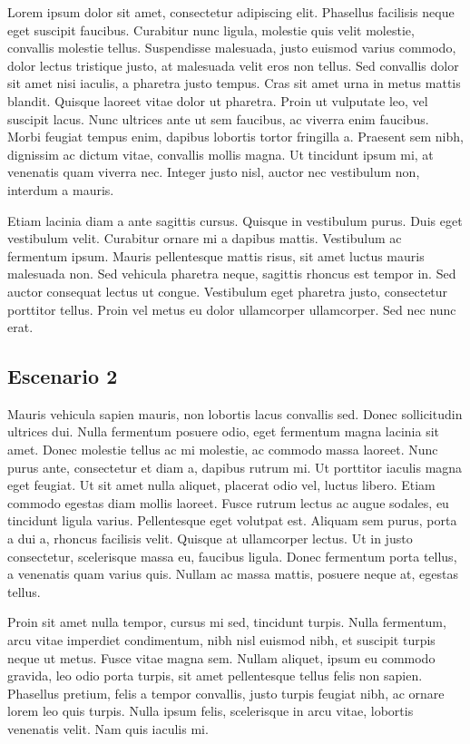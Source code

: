 \documentclass[a4paper, 10pt, twoside]{article}
\begin{document}
Lorem ipsum dolor sit amet, consectetur adipiscing elit. Phasellus facilisis neque eget suscipit faucibus. Curabitur nunc ligula, molestie quis velit molestie, convallis molestie tellus. Suspendisse malesuada, justo euismod varius commodo, dolor lectus tristique justo, at malesuada velit eros non tellus. Sed convallis dolor sit amet nisi iaculis, a pharetra justo tempus. Cras sit amet urna in metus mattis blandit. Quisque laoreet vitae dolor ut pharetra. Proin ut vulputate leo, vel suscipit lacus. Nunc ultrices ante ut sem faucibus, ac viverra enim faucibus. Morbi feugiat tempus enim, dapibus lobortis tortor fringilla a. Praesent sem nibh, dignissim ac dictum vitae, convallis mollis magna. Ut tincidunt ipsum mi, at venenatis quam viverra nec. Integer justo nisl, auctor nec vestibulum non, interdum a mauris.

Etiam lacinia diam a ante sagittis cursus. Quisque in vestibulum purus. Duis eget vestibulum velit. Curabitur ornare mi a dapibus mattis. Vestibulum ac fermentum ipsum. Mauris pellentesque mattis risus, sit amet luctus mauris malesuada non. Sed vehicula pharetra neque, sagittis rhoncus est tempor in. Sed auctor consequat lectus ut congue. Vestibulum eget pharetra justo, consectetur porttitor tellus. Proin vel metus eu dolor ullamcorper ullamcorper. Sed nec nunc erat.


\subsection{Escenario 2}

Mauris vehicula sapien mauris, non lobortis lacus convallis sed. Donec sollicitudin ultrices dui. Nulla fermentum posuere odio, eget fermentum magna lacinia sit amet. Donec molestie tellus ac mi molestie, ac commodo massa laoreet. Nunc purus ante, consectetur et diam a, dapibus rutrum mi. Ut porttitor iaculis magna eget feugiat. Ut sit amet nulla aliquet, placerat odio vel, luctus libero. Etiam commodo egestas diam mollis laoreet. Fusce rutrum lectus ac augue sodales, eu tincidunt ligula varius. Pellentesque eget volutpat est. Aliquam sem purus, porta a dui a, rhoncus facilisis velit. Quisque at ullamcorper lectus. Ut in justo consectetur, scelerisque massa eu, faucibus ligula. Donec fermentum porta tellus, a venenatis quam varius quis. Nullam ac massa mattis, posuere neque at, egestas tellus.

Proin sit amet nulla tempor, cursus mi sed, tincidunt turpis. Nulla fermentum, arcu vitae imperdiet condimentum, nibh nisl euismod nibh, et suscipit turpis neque ut metus. Fusce vitae magna sem. Nullam aliquet, ipsum eu commodo gravida, leo odio porta turpis, sit amet pellentesque tellus felis non sapien. Phasellus pretium, felis a tempor convallis, justo turpis feugiat nibh, ac ornare lorem leo quis turpis. Nulla ipsum felis, scelerisque in arcu vitae, lobortis venenatis velit. Nam quis iaculis mi.
\end{document}
